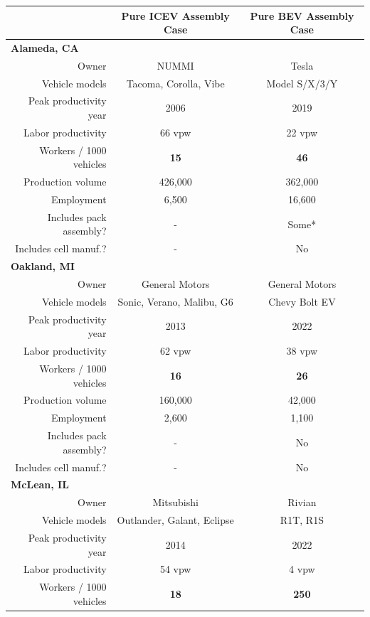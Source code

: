 \documentclass[sn-mathphys,Numbered]{sn-jnl}%
\begin{document}
\begin{table}
    \centering
    \begin{tabular}{rcc}
        & Pure ICEV Assembly Case & Pure BEV Assembly Case \\
        \toprule        
        \multicolumn{1}{l}{\textbf{Alameda, CA}} & & \\
        Owner & NUMMI & Tesla \\
        Vehicle models & Tacoma, Corolla, Vibe & Model S/X/3/Y \\
        Peak productivity year & 2006 & 2019 \\
        Labor productivity & 66 vpw & 22 vpw \\
        Workers / 1000 vehicles & \textbf{15} & \textbf{46} \\
        Production volume & 426,000 & 362,000 \\
        Employment & 6,500 & 16,600 \\
        Includes pack assembly? & - & Some* \\
        Includes cell manuf.? & - & No \\
        \midrule
        \multicolumn{1}{l}{\textbf{Oakland, MI}} & & \\
        Owner & General Motors & General Motors \\
        Vehicle models & Sonic, Verano, Malibu, G6 & Chevy Bolt EV \\
        Peak productivity year & 2013 & 2022 \\
        Labor productivity & 62 vpw & 38 vpw \\
        Workers / 1000 vehicles & \textbf{16} & \textbf{26} \\
        Production volume & 160,000 & 42,000 \\
        Employment & 2,600 & 1,100 \\
        Includes pack assembly? & - & No \\
        Includes cell manuf.? & - & No \\
        \midrule
        \multicolumn{1}{l}{\textbf{McLean, IL}} & & \\
        Owner & Mitsubishi & Rivian \\
        Vehicle models & Outlander, Galant, Eclipse & R1T, R1S \\
        Peak productivity year & 2014 & 2022 \\
        Labor productivity & 54 vpw & 4 vpw \\
        Workers / 1000 vehicles & \textbf{18} & \textbf{250} \\

\end{tabular}
\end{table}
\end{document}
